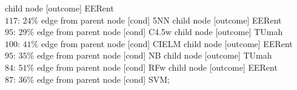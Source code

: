 child {node [outcome] {EERent \\$117$: $24\%$} edge from parent node [cond] {5NN}}
child {node [outcome] {EERent \\$95$: $29\%$} edge from parent node [cond] {C4.5w}}
child {node [outcome] {TUmah \\$100$: $41\%$} edge from parent node [cond] {CIELM}}
child {node [outcome] {EERent \\$95$: $35\%$} edge from parent node [cond] {NB}}
child {node [outcome] {TUmah \\$84$: $51\%$} edge from parent node [cond] {RFw}}
child {node [outcome] {EERent \\$87$: $36\%$} edge from parent node [cond] {SVM}};
